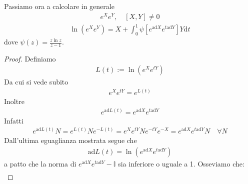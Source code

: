 \begin{teorema} %
Passiamo ora a calcolare in generale
\begin{equation*}\begin{split}
e^Xe^Y ,\quad \left[X,Y\right] \neq 0
\end{split}\end{equation*}
\begin{equation*}\begin{split}
\ln{\left(e^Xe^Y\right)}=X+\int_{0}^{1}{\psi\left[e^{\textrm{ad}X}e^{t\textrm{ad}Y}\right]Y \textrm{d}t}
\end{split}\end{equation*}
dove  $\psi\left(z\right)=\frac{z\ln{z}}{z-1}$.
\end{teorema}
\begin{proof}
Definiamo
\begin{equation*}\begin{split}
L\left(t\right):=\ln{\left(e^Xe^{tY}\right)}
\end{split}\end{equation*}
Da cui si vede subito
\begin{equation*}\begin{split}
e^Xe^{tY}=e^{L\left(t\right)}
\end{split}\end{equation*}
Inoltre
\begin{equation*}\begin{split}
e^{\textrm{ad}L\left(t\right)}=e^{\textrm{ad}X}e^{t\textrm{ad}Y}
\end{split}\end{equation*}
Infatti
\begin{equation*}\begin{split}
e^{\textrm{ad}L\left(t\right)}N=e^{L\left(t\right)}Ne^{-L\left(t\right)}=e^Xe^{tY}Ne^{-tY}e^{-X}=e^{\textrm{ad}X}e^{t\textrm{ad}Y}N \quad \forall N
\end{split}\end{equation*}
Dall'ultima eguaglianza mostrata segue che
\begin{equation*}\begin{split}
\textrm{ad}L\left(t\right)=\ln{\left(e^{\textrm{ad}X}e^{t\textrm{ad}Y}\right)}
\end{split}\end{equation*}
a patto che la norma di $e^{\textrm{ad}X}e^{t\textrm{ad}Y}-\mathbb{I}$ sia inferiore o uguale a 1.
Osseviamo che:
\begin{equation*}\begin{split}

\end{split}
\end{equation*}
\end{proof}

